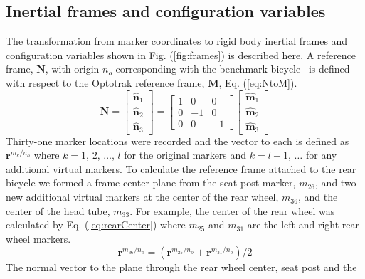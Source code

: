 \documentclass[smallextended]{svjour3}     %
\begin{document}

\begin{appendices}
\section{Inertial frames and configuration variables}
\label{sec:inFrames}
The transformation from marker coordinates to rigid body inertial frames and
configuration variables shown in Fig. (\ref{fig:frames}) is described here. A
reference frame, $\mathbf{N}$, with origin $n_o$ corresponding with the
benchmark bicycle~\cite{Meijaard2007} is defined with respect to the Optotrak
reference frame, $\mathbf{M}$, Eq. (\ref{eq:NtoM}).
\begin{equation}
    \mathbf{N}=
    \left[
    \begin{array}{c}
    \hat{\mathbf{n}}_1\\
    \hat{\mathbf{n}}_2\\
    \hat{\mathbf{n}}_3
  \end{array}
    \right]
    =
    \left[
    \begin{array}{rrr}
    1 &  0 &  0\\
    0 & -1 &  0\\
    0 &  0 & -1
    \end{array}
    \right]
    \left[
    \begin{array}{c}
    \hat{\mathbf{m}}_1\\
    \hat{\mathbf{m}}_2\\
    \hat{\mathbf{m}}_3
  \end{array}
    \right]
\label{eq:NtoM}
\end{equation}
Thirty-one marker locations were recorded and the vector to each is defined as
$\mathbf{r}^{{m_{k}}/{n_o}}$ where $k=1$, $2$, $\ldots$, $l$ for the original
markers and $k=l+1$, $\ldots$ for any additional virtual markers.  To calculate
the reference frame attached to the rear bicycle we formed a frame center plane
from the seat post marker, $m_{26}$, and two new additional virtual markers at
the center of the rear wheel, $m_{36}$, and the center of the head tube,
$m_{33}$. For example, the center of the rear wheel was calculated by Eq.
(\ref{eq:rearCenter}) where $m_{25}$ and $m_{31}$ are the left and right rear
wheel markers.
\begin{equation}
    \mathbf{r}^{{m_{36}}/{n_o}}=(\mathbf{r}^{{m_{25}}/{n_o}}+\mathbf{r}^{{m_{31}}/{n_o}})/2
\label{eq:rearCenter}
\end{equation}
The normal vector to the plane through the rear wheel center, seat post and the

\end{appendices}
\end{document}
